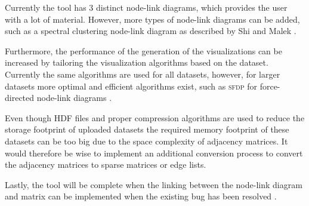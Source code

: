 \documentclass[journal]{vgtc}                %
\begin{document}
Currently the tool has 3 distinct node-link diagrams, which provides the user with a lot of material. However, more types of node-link diagrams can be added, such as a spectral clustering node-link diagram as described by Shi and Malek \cite{shi2000normalized}.

Furthermore, the performance of the generation of the visualizations can be increased by tailoring the visualization algorithms based on the dataset. Currently the same algorithms are used for all datasets, however, for larger datasets more optimal and efficient algorithms exist, such as \textsc{sfdp} for force-directed node-link diagrams \cite{hu2005efficient}.

Even though HDF files and proper compression algorithms are used to reduce the storage footprint of uploaded datasets the required memory footprint of these datasets can be too big due to the space complexity of adjacency matrices. It would therefore be wise to implement an additional conversion process to convert the adjacency matrices to sparse matrices or edge lists.

Lastly, the tool will be complete when the linking between the node-link diagram and matrix can be implemented when the existing bug has been resolved \cite{Broek:2019}.
\end{document}
